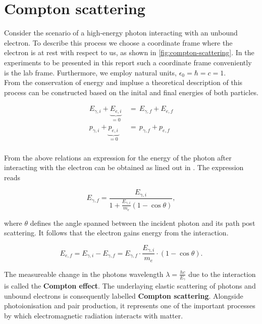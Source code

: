 
\section{Compton scattering}
\label{sec:compton-scattering}

Consider the scenario of a high-energy photon interacting with an unbound electron. To describe this process we choose a
coordinate frame where the electron is at rest with respect to us, as
shown in \autoref{fig:compton-scattering}. In the experiments
to be presented in this report such a coordinate frame conveniently is the lab frame.
Furthermore, we employ natural units, $\epsilon_0=\hbar=c=1$. \\
From the conservation of energy and impluse a theoretical description of this process
can be constructed based on the inital and final energies of both particles.

\begin{align*}
E_{\gamma,i} + \underbrace{E_{e,i}}_{=0}\,&=\,E_{\gamma,f}+E_{e,f} \\
p_{\gamma,i} + \underbrace{p_{e,i}}_{=0}\,&=\,p_{\gamma,f}+p_{e,f} \\
\end{align*}

From the above relations an expression for the energy of the photon after interacting
with the electron can be obtained as lined out in \cite{Sch17}. The expression reads

\begin{equation}
\label{eq:photon-energy}
E_{\gamma,f}=\frac{E_{\gamma,i}}{1+\frac{E_{\gamma,i}}{m_e}(1-\cos\theta)},
\end{equation}

where $\theta$ defines the angle spanned between the incident photon and its path
post scattering. It follows that the electron gains energy from the interaction.

\begin{equation}
\label{eq:electron-energy}
E_{e,f}=E_{\gamma,i}-E_{\gamma,f}=E_{\gamma,f}\cdot\frac{E_{\gamma,i}}{m_e}\cdot(1-\cos\theta).
\end{equation}

The measureable change in the photons wavelength $\lambda=\frac{hc}{E_{\gamma}}$
due to the interaction is called the \textbf{Compton effect}. The underlaying elastic
scattering of photons and unbound electrons is consequently labelled \textbf{Compton
scattering}. Alongside photoionisation and pair production, it represents one of the
important processes by which electromagnetic radiation interacts with matter.

